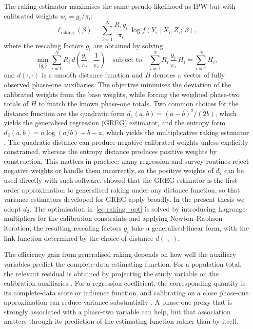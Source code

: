The raking estimator maximises the same pseudo-likelihood as IPW but with calibrated weights $w_i = g_i / \pi_i$:
\begin{equation}
    \ell_{\mathrm{raking}}(\beta)
    = \sum_{i=1}^{N} \frac{R_i\, g_i}{\pi_i}\,
    \log f(Y_i \mid X_i, Z_i;\, \beta),
    \label{eq:raking}
\end{equation}
where the rescaling factors $g_i$ are obtained by solving
\begin{equation}
    \min_{\{g_i\}} \sum_{i=1}^{N} R_i\,
    d\!\left(\frac{g_i}{\pi_i},\; \frac{1}{\pi_i}\right)
    \quad \text{subject to} \quad
    \sum_{i=1}^{N} R_i\, \frac{g_i}{\pi_i}\, H_i
    = \sum_{i=1}^{N} H_i,
    \label{eq:raking_opt}
\end{equation}
and $d(\cdot, \cdot)$ is a smooth distance function and $H$ denotes a vector of fully observed phase-one auxiliaries. The objective minimises the deviation of the calibrated weights from the base weights, while forcing the weighted phase-two totals of $H$ to match the known phase-one totals. Two common choices for the distance function are the quadratic form $d_1(a,b) = (a - b)^2 / (2b)$, which yields the generalised regression (GREG) estimator, and the entropy form $d_2(a,b) = a\log(a/b) + b - a$, which yields the multiplicative raking estimator \citep{lumley2011connections}. The quadratic distance can produce negative calibrated weights unless explicitly constrained, whereas the entropy distance produces positive weights by construction. This matters in practice: many regression and survey routines reject negative weights or handle them incorrectly, so the positive weights of $d_2$ can be used directly with such software. \citet{deville1992calibration} showed that the GREG estimator is the first-order approximation to generalised raking under any distance function, so that variance estimators developed for GREG apply broadly. In the present thesis we adopt $d_2$. The optimisation in~\eqref{eq:raking_opt} is solved by introducing Lagrange multipliers for the calibration constraints and applying Newton--Raphson iteration; the resulting rescaling factors $g_i$ take a generalised-linear form, with the link function determined by the choice of distance $d(\cdot,\cdot)$.

The efficiency gain from generalised raking depends on how well the auxiliary variables predict the complete-data estimating function. For a population total, the relevant residual is obtained by projecting the study variable on the calibration auxiliaries \citep{deville1992calibration}. For a regression coefficient, the corresponding quantity is its complete-data score or influence function, and calibrating on a close phase-one approximation can reduce variance substantially \citep{lumley2011connections}. A phase-one proxy that is strongly associated with a phase-two variable can help, but that association matters through its prediction of the estimating function rather than by itself.


